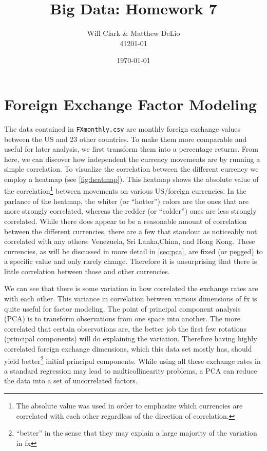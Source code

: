 \documentclass[11pt, fleqn]{article}
\begin{document}
\title{Big Data: Homework 7}
\author{Will Clark \& Matthew DeLio \\ 41201-01}
\date{\today}
\maketitle

\section{Foreign Exchange Factor Modeling} \label{sec:intro}
The data contained in \texttt{FXmonthly.csv} are monthly foreign exchange values between the US and 23 other countries.  To make them more comparable and useful for later analysis, we first transform them into a percentage returns.  From here, we can discover how independent the currency movements are by running a simple correlation.  To visualize the correlation between the different currency we employ a heatmap (see \vref{fig:heatmap}).  This heatmap shows the absolute value of the correlation\footnote{The absolute value was used in order to emphasize which currencies are correlated with each other regardless of the direction of correlation.} between movements on various US/foreign currencies.  In the parlance of the heatmap, the whiter (or ``hotter'') colors are the ones that are more strongly correlated, whereas the redder (or ``colder'') ones are less strongly correlated.  While there does appear to be a reasonable amount of correlation between the different currencies, there are a few that standout as noticeably not correlated with any others: Venezuela, Sri Lanka,China, and Hong Kong.  These currencies, as will be discussed in more detail in \cref{sec:pca}, are fixed (or pegged) to a specific value and only rarely change.  Therefore it is unsurprising that there is little correlation between those and other currencies.

We can see that there is some variation in how correlated the exchange rates are with each other. This variance in correlation between various dimensions of fx is quite useful for factor modeling.  The point of principal component analysis (PCA) is to transform observations from one space into another.  The more correlated that certain observations are, the better job the first few rotations (principal components) will do explaining the variation.  Therefore having highly correlated foreign exchange dimensions, which this data set mostly has, should yield better\footnote{``better'' in the sense that they may explain a large majority of the variation in fx} initial principal components. While using all these exchange rates in a standard regression may lead to multicollinearity problems, a PCA can reduce the data into a set of uncorrelated factors. 
\end{document}
